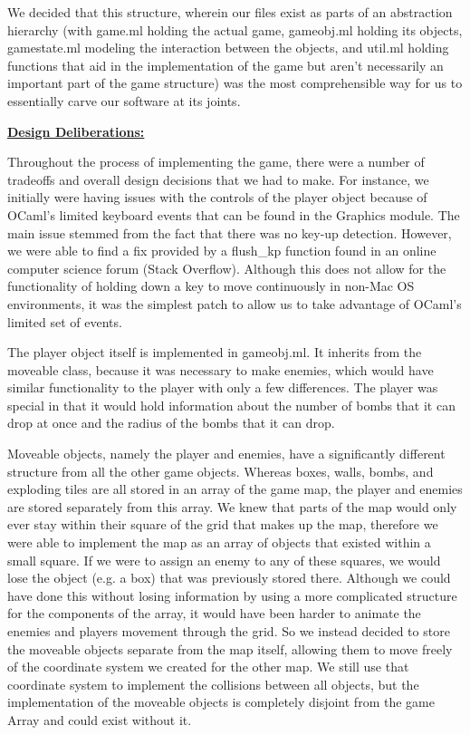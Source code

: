 \documentclass[12pt]{article}
\begin{document}
We decided that this structure, wherein our files exist as parts of an abstraction hierarchy (with game.ml holding the actual game, gameobj.ml holding its objects, gamestate.ml modeling the interaction between the objects, and util.ml holding functions that aid in the implementation of the game but aren't necessarily an important part of the game structure) was the most comprehensible way for us to essentially carve our software at its joints.\par


\vspace{\baselineskip}
\textbf{\uline{Design Deliberations:}}\par

Throughout the process of implementing the game, there were a number of tradeoffs and overall design decisions that we had to make. For instance, we initially were having issues with the controls of the player object because of OCaml’s limited keyboard events that can be found in the Graphics module. The main issue stemmed from the fact that there was no key-up detection. However, we were able to find a fix provided by a flush\_kp function found in an online computer science forum (Stack Overflow). Although this does not allow for the functionality of holding down a key to move continuously in non-Mac OS environments, it was the simplest patch to allow us to take advantage of OCaml’s limited set of events. \par


\vspace{\baselineskip}
The player object itself is implemented in gameobj.ml. It inherits from the moveable class, because it was necessary to make enemies, which would have similar functionality to the player with only a few differences. The player was special in that it would hold information about the number of bombs that it can drop at once and the radius of the bombs that it can drop. \par


\vspace{\baselineskip}
Moveable objects, namely the player and enemies, have a significantly different structure from all the other game objects. Whereas boxes, walls, bombs, and exploding tiles are all stored in an array of the game map, the player and enemies are stored separately from this array. We knew that parts of the map would only ever stay within their square of the grid that makes up the map, therefore we were able to implement the map as an array of objects that existed within a small square. If we were to assign an enemy to any of these squares, we would lose the object (e.g. a box) that was previously stored there. Although we could have done this without losing information by using a more complicated structure for the components of the array, it would have been harder to animate the enemies and players movement through the grid. So we instead decided to store the moveable objects separate from the map itself, allowing them to move freely of the coordinate system we created for the other map. We still use that coordinate system to implement the collisions between all objects, but the implementation of the moveable objects is completely disjoint from the game Array and could exist without it.\par
\end{document}
